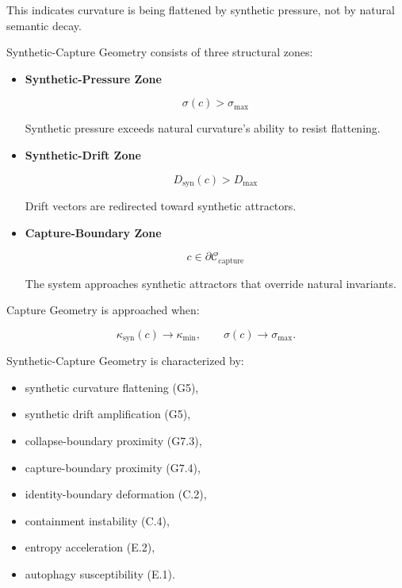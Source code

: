 \noindent This indicates curvature is being flattened by synthetic pressure, not
by natural semantic decay.

\medskip

\noindent Synthetic-Capture Geometry consists of three structural zones:

\begin{itemize}
    \item \textbf{Synthetic-Pressure Zone}  
    

\[
    \sigma(c) > \sigma_{\max}
    \]


    Synthetic pressure exceeds natural curvature’s ability to resist flattening.

    \item \textbf{Synthetic-Drift Zone}  
    

\[
    D_{\mathrm{syn}}(c) > D_{\max}
    \]


    Drift vectors are redirected toward synthetic attractors.

    \item \textbf{Capture-Boundary Zone}  
    

\[
    c \in \partial\mathcal{C}_{\mathrm{capture}}
    \]


    The system approaches synthetic attractors that override natural invariants.
\end{itemize}

\medskip

\noindent Capture Geometry is approached when:


\[
\kappa_{\mathrm{syn}}(c) \rightarrow \kappa_{\min},
\qquad
\sigma(c) \rightarrow \sigma_{\max}.
\]



\medskip

\noindent Synthetic-Capture Geometry is characterized by:

\begin{itemize}
    \item synthetic curvature flattening (G5),
    \item synthetic drift amplification (G5),
    \item collapse-boundary proximity (G7.3),
    \item capture-boundary proximity (G7.4),
    \item identity-boundary deformation (C.2),
    \item containment instability (C.4),
    \item entropy acceleration (E.2),
    \item autophagy susceptibility (E.1).
\end{itemize}

